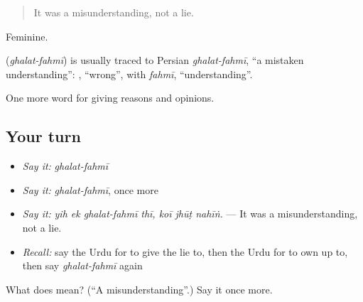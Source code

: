 \begin{quote}
It was a misunderstanding, not a lie.
\end{quote}

Feminine.

\begin{cousinweb}
\textbf{ } (\emph{ghalat-fahmī}) is usually traced to Persian \emph{ghalat-fahmī}, \textquotedblleft{}a mistaken understanding\textquotedblright{}: \textbf{}, \textquotedblleft{}wrong\textquotedblright{}, with \emph{fahmī}, \textquotedblleft{}understanding\textquotedblright{}.
\end{cousinweb}

\begin{grammarlens}[title={What you've built}]
One more word for giving reasons and opinions.
\end{grammarlens}

\subsection*{Your turn}
\begin{itemize}
\raggedright
  \item \emph{Say it:} \emph{ghalat-fahmī}
  \item \emph{Say it:} \emph{ghalat-fahmī}, once more
  \item \emph{Say it:} \emph{yih ek ghalat-fahmī thī, koī jhūṭ nahīṅ.} — It was a misunderstanding, not a lie.
  \item \emph{Recall:} say the Urdu for to give the lie to, then the Urdu for to own up to, then say \emph{ghalat-fahmī} again
\end{itemize}

\begin{tcolorbox}[breakable,colback=teal!4,colframe=teal!35!black,title={Before you move on}]
What does   mean? (\textquotedblleft{}A misunderstanding\textquotedblright{}.) Say it once more.
\end{tcolorbox}
